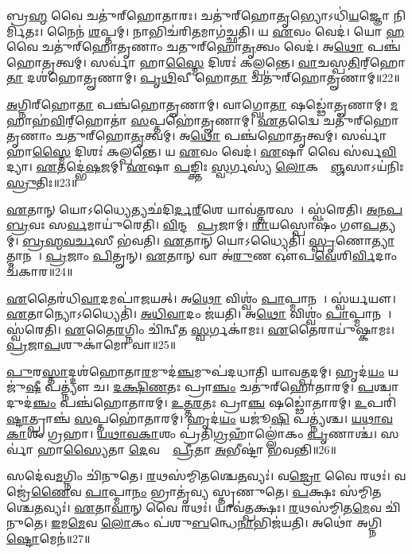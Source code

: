    𑌬𑍍𑌰\ul{𑌹𑍍𑌮} 𑌵𑍈 𑌚𑌤𑍁॑𑌰𑍍‌𑌹𑍋𑌤𑌾𑌰𑌃।
   𑌚𑌤𑍁॑𑌰𑍍‌𑌹𑍋\ul{𑌤𑍃}𑌭𑍍𑌯𑍋𑌽𑌧𑌿॑\ul{𑌯}𑌜𑍍𑌞𑍋 𑌨𑌿𑌰𑍍𑌮𑌿॑𑌤𑌃।
   𑌨𑍈𑌨॑ \ul{𑌶}𑌪𑍍𑌤𑌮𑍍।
   𑌨𑌾𑌭𑌿𑌚॑𑌰𑌿\ul{𑌤}𑌮𑌾𑌗॑𑌚𑍍𑌛𑌤𑌿।
   𑌯 \ul{𑌏}𑌵𑌂 𑌵𑍇𑌦॑।
   𑌯𑍋 \ul{𑌹} 𑌵𑍈 𑌚𑌤𑍁॑𑌰𑍍‌𑌹𑍋𑌤𑍃𑌣𑌾𑌂 𑌚𑌤𑍁𑌰𑍍‌𑌹𑍋\ul{𑌤𑍃}𑌤𑍍𑌵𑌂 𑌵𑍇𑌦॑।
   𑌅\ul{𑌥𑍋} 𑌪𑌞𑍍𑌚॑𑌹𑍋𑌤𑍃𑌤𑍍𑌵𑌮𑍍।
   𑌸𑌰𑍍𑌵𑌾॑ 𑌹𑌾\ul{𑌸𑍍𑌮𑍈} 𑌦𑌿𑌶𑌃॑ 𑌕𑌲𑍍𑌪𑌨𑍍𑌤𑍇।
   \ul{𑌵𑌾}𑌚𑌸𑍍𑌪\ul{𑌤𑌿}𑌰𑍍‌॒𑌹𑍋\ul{𑌤𑌾} 𑌦𑌶॑𑌹𑍋𑌤𑍄𑌣𑌾𑌮𑍍।
   \ul{𑌪𑍃}\ul{𑌥𑌿}𑌵𑍀 𑌹𑍋\ul{𑌤𑌾} 𑌚𑌤𑍁॑𑌰𑍍‌𑌹𑍋𑌤𑍄𑌣𑌾𑌮𑍍॥22॥

   \ul{𑌅}𑌗𑍍𑌨𑌿𑌰𑍍‌𑌹𑍋\ul{𑌤𑌾} 𑌪𑌞𑍍𑌚॑𑌹𑍋𑌤𑍄𑌣𑌾𑌮𑍍।
   𑌵𑌾𑌗𑍍𑌘𑍋\ul{𑌤𑌾} 𑌷𑌡𑍍𑌢𑍋॑𑌤𑍄𑌣𑌾𑌮𑍍।
   \ul{𑌮}𑌹𑌾𑌹॑\ul{𑌵𑌿}𑌰𑍍‌॒𑌹𑍋𑌤𑌾॑ \ul{𑌸}𑌪𑍍𑌤𑌹𑍋॑𑌤𑍄𑌣𑌾𑌮𑍍।
   \ul{𑌏}𑌤𑌦𑍍𑌵𑍈 𑌚𑌤𑍁॑𑌰𑍍‌𑌹𑍋𑌤𑍃𑌣𑌾𑌂 𑌚𑌤𑍁𑌰𑍍‌𑌹𑍋\ul{𑌤𑍃}𑌤𑍍𑌵𑌮𑍍।
   𑌅\ul{𑌥𑍋} 𑌪𑌞𑍍𑌚॑𑌹𑍋𑌤𑍃𑌤𑍍𑌵𑌮𑍍।
   𑌸𑌰𑍍𑌵𑌾॑ 𑌹𑌾\ul{𑌸𑍍𑌮𑍈} 𑌦𑌿𑌶𑌃॑ 𑌕𑌲𑍍𑌪𑌨𑍍𑌤𑍇।
   𑌯 \ul{𑌏}𑌵𑌂 𑌵𑍇𑌦॑।
   \ul{𑌏}𑌷𑌾 𑌵𑍈 𑌸॑𑌰𑍍𑌵\ul{𑌵𑌿}𑌦𑍍𑌯𑌾।
   \ul{𑌏}𑌤𑌦𑍍𑌭𑍇॑\ul{𑌷}𑌜𑌮𑍍।
   \ul{𑌏}𑌷𑌾 \ul{𑌪}𑌙𑍍𑌕𑍍𑌤𑌿𑌃 \ul{𑌸𑍍𑌵}𑌰𑍍𑌗𑌸𑍍𑌯॑ \ul{𑌲𑍋}𑌕𑌸𑍍𑌯𑌾᳚\ul{𑌞𑍍𑌜}𑌸𑌾𑌽𑌯॑𑌨𑌿𑌃 \ul{𑌸𑍍𑌰𑍁}𑌤𑌿𑌃॥23॥

   \ul{𑌏}𑌤𑌾𑌨𑍍 𑌯𑍋𑌽𑌧𑍍𑌯𑍈𑌤𑍍𑌯𑌛॑𑌦𑌿\ul{𑌰𑍍𑌦}\ul{𑌰𑍍}‌𑌶𑍇 𑌯𑌾𑌵॑\ul{𑌤𑍍𑌤}𑌰𑌸𑌮𑍍᳚।
   𑌸𑍍𑌵॑𑌰𑍇𑌤𑌿।
   \ul{𑌅}\ul{𑌨}\ul{𑌪}\ul{𑌬𑍍𑌰}𑌵𑌃 𑌸\ul{𑌰𑍍𑌵}𑌮𑌾𑌯𑍁॑𑌰𑍇𑌤𑌿।
   \ul{𑌵𑌿}𑌨𑍍𑌦𑌤𑍇᳚ \ul{𑌪𑍍𑌰}𑌜𑌾𑌮𑍍।
   \ul{𑌰𑌾}𑌯𑌸𑍍𑌪𑍋𑌷𑌂॑ 𑌗𑍗\ul{𑌪}𑌤𑍍𑌯𑌮𑍍।
   \ul{𑌬𑍍𑌰}\ul{𑌹𑍍𑌮}\ul{𑌵}\ul{𑌰𑍍𑌚}𑌸𑍀 𑌭॑𑌵𑌤𑌿।
   \ul{𑌏}𑌤𑌾𑌨𑍍 𑌯𑍋𑌽𑌧𑍍𑌯𑍈𑌤𑌿॑।
   \ul{𑌸𑍍𑌪𑍃}𑌣𑍋\ul{𑌤𑍍𑌯𑌾}𑌤𑍍𑌮𑌾𑌨𑌮𑍍᳚।
   \ul{𑌪𑍍𑌰}𑌜𑌾𑌂 \ul{𑌪𑌿}𑌤𑍄𑌨𑍍।
   \ul{𑌏}𑌤𑌾𑌨𑍍 𑌵𑌾 𑌅॑\ul{𑌰𑍁}𑌣 𑌔॑𑌪\ul{𑌵𑍇}𑌶𑌿\ul{𑌰𑍍𑌵𑌿}𑌦𑌾𑌂 𑌚॑𑌕𑌾𑌰॥24॥

   \ul{𑌏}𑌤𑍈𑌰॑𑌧𑌿\ul{𑌵𑌾}𑌦𑌮𑌪𑌾॑𑌜𑌯𑌤𑍍।
   𑌅\ul{𑌥𑍋} 𑌵𑌿𑌶𑍍𑌵𑌂॑ \ul{𑌪𑌾}𑌪𑍍𑌮𑌾𑌨𑌮𑍍᳚।
   𑌸𑍍𑌵॑𑌰𑍍𑌯𑌯𑍗।
   \ul{𑌏}𑌤𑌾𑌨𑍍𑌯𑍋𑌽𑌧𑍍𑌯𑍈𑌤𑌿॑।
   \ul{𑌅}\ul{𑌧𑌿}\ul{𑌵𑌾}𑌦𑌂 𑌜॑𑌯𑌤𑌿।
   𑌅\ul{𑌥𑍋} 𑌵𑌿𑌶𑍍𑌵𑌂॑ \ul{𑌪𑌾}𑌪𑍍𑌮𑌾𑌨𑌮𑍍᳚।
   𑌸𑍍𑌵॑𑌰𑍇𑌤𑌿।
   \ul{𑌏}𑌤𑍈\ul{𑌰}𑌗𑍍𑌨𑌿𑌂 𑌚𑌿॑𑌨𑍍𑌵𑍀𑌤 \ul{𑌸𑍍𑌵}𑌰𑍍𑌗𑌕𑌾॑𑌮𑌃।
   \ul{𑌏}𑌤𑍈𑌰𑌾𑌯𑍁॑𑌷𑍍𑌕𑌾𑌮𑌃।
   \ul{𑌪𑍍𑌰}𑌜𑌾\ul{𑌪}𑌶𑍁𑌕𑌾॑𑌮𑍋 𑌵𑌾॥25॥

   \ul{𑌪𑍁}𑌰\ul{𑌸𑍍𑌤𑌾}𑌦𑍍𑌦𑌶॑𑌹𑍋𑌤𑌾\ul{𑌰}𑌮𑍁𑌦॑\ul{𑌞𑍍𑌚}𑌮𑍁𑌪॑𑌦𑌧𑌾𑌤𑌿 𑌯𑌾𑌵\ul{𑌤𑍍𑌪}𑌦𑌮𑍍।
   𑌹𑍃𑌦॑\ul{𑌯𑌂} 𑌯𑌜𑍁॑\ul{𑌷𑍀} 𑌪𑌤𑍍𑌨𑍍𑌯𑍗॑ 𑌚।
   \ul{𑌦}\ul{𑌕𑍍𑌷𑌿}\ul{𑌣}𑌤𑌃 𑌪𑍍𑌰𑌾\ul{𑌞𑍍𑌚𑌂} 𑌚𑌤𑍁॑𑌰𑍍‌𑌹𑍋𑌤𑌾𑌰𑌮𑍍।
   \ul{𑌪}𑌶𑍍𑌚𑌾𑌦𑍁𑌦॑\ul{𑌞𑍍𑌚𑌂} 𑌪𑌞𑍍𑌚॑𑌹𑍋𑌤𑌾𑌰𑌮𑍍।
   \ul{𑌉}\ul{𑌤𑍍𑌤}\ul{𑌰}𑌤𑌃 𑌪𑍍𑌰𑌾\ul{𑌞𑍍𑌚}\ul{} 𑌷𑌡𑍍𑌢𑍋॑𑌤𑌾𑌰𑌮𑍍।
   \ul{𑌉}𑌪𑌰𑌿॑\ul{𑌷𑍍𑌟𑌾}𑌤𑍍𑌪𑍍𑌰𑌾𑌞𑍍𑌚॑ \ul{𑌸}𑌪𑍍𑌤𑌹𑍋॑𑌤𑌾𑌰𑌮𑍍।
   𑌹𑍃𑌦॑\ul{𑌯𑌂} 𑌯𑌜𑍂॑\ul{𑌷𑌿} 𑌪𑌤𑍍𑌨𑍍𑌯॑𑌶𑍍𑌚।
   \ul{𑌯}\ul{𑌥𑌾}\ul{𑌵}\ul{𑌕𑌾}𑌶𑌂 𑌗𑍍𑌰𑌹𑌾\sn{}।
   \ul{𑌯}\ul{𑌥𑌾}\ul{𑌵}\ul{𑌕𑌾}𑌶𑌂 𑌪𑍍𑌰॑𑌤𑌿\ul{𑌗𑍍𑌰}𑌹𑌾𑌁𑌲𑍍𑌲𑍋॑𑌕𑌂  \ul{𑌪𑍃}𑌣𑌾𑌶𑍍𑌚॑।
   𑌸𑌰𑍍𑌵𑌾॑ 𑌹𑌾\ul{𑌸𑍍𑌯𑍈}𑌤𑌾 \ul{𑌦𑍇}𑌵𑌤𑌾𑌃᳚ \ul{𑌪𑍍𑌰𑍀}𑌤𑌾 \ul{𑌅}𑌭𑍀𑌷𑍍𑌟𑌾॑ 𑌭𑌵𑌨𑍍𑌤𑌿॥26॥

   𑌸𑌦𑍇॑𑌵\ul{𑌮}𑌗𑍍𑌨𑌿𑌂 𑌚𑌿॑𑌨𑍁𑌤𑍇।
   \ul{𑌰}𑌥𑌸॑𑌮𑍍𑌮𑌿𑌤𑌶𑍍𑌚𑍇\ul{𑌤}𑌵𑍍𑌯𑌃॑।
   𑌵\ul{𑌜𑍍𑌰𑍋} 𑌵𑍈 𑌰𑌥𑌃॑।
   𑌵𑌜𑍍𑌰𑍇॑\ul{𑌣𑍈}𑌵 \ul{𑌪𑌾}𑌪𑍍𑌮𑌾\ul{𑌨𑌂} 𑌭𑍍𑌰𑌾𑌤𑍃॑𑌵𑍍𑌯 𑌸𑍍𑌤𑍃𑌣𑍁𑌤𑍇।
   \ul{𑌪}𑌕𑍍𑌷𑌃 𑌸॑𑌮𑍍𑌮𑌿𑌤𑌶𑍍𑌚𑍇\ul{𑌤}𑌵𑍍𑌯𑌃॑।
   \ul{𑌏}𑌤𑌾\ul{𑌵𑌾}𑌨𑍍 𑌵𑍈 𑌰𑌥𑌃॑।
   𑌯𑌾𑌵॑\ul{𑌤𑍍𑌪}𑌕𑍍𑌷𑌃।
   \ul{𑌰}𑌥𑌸॑𑌮𑍍𑌮𑌿𑌤\ul{𑌮𑍇}𑌵 𑌚𑌿॑𑌨𑍁𑌤𑍇।
   \ul{𑌇}𑌮\ul{𑌮𑍇}𑌵 \ul{𑌲𑍋}𑌕𑌂 𑌪॑𑌶𑍁\ul{𑌬}𑌨𑍍𑌧𑍇\ul{𑌨𑌾}𑌭𑌿𑌜॑𑌯𑌤𑌿।
   𑌅𑌥𑍋॑ 𑌅𑌗𑍍𑌨𑌿\ul{𑌷𑍍𑌟𑍋}𑌮𑍇𑌨॑॥27॥

